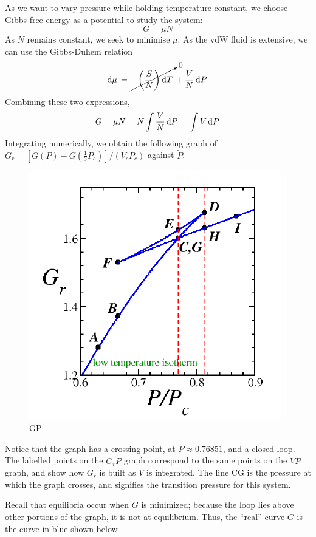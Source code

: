 As we want to vary pressure while holding temperature constant, we choose Gibbs free energy as a potential to study the system:
\[G=\mu N\]
As \(N\) remains constant, we seek to minimise \(\mu\). As the vdW fluid is extensive, we can use the Gibbs-Duhem relation
\[\d\mu =\cancelto{0}{-\left(\frac{S}{N}\right)\d{T}}+\frac{V}{N}\d{P}\]
Combining these two expressions,
\[G=\mu N = N\int\frac{V}{N}\d{P}=\int V\d{P}\]
Integrating numerically, we obtain the following graph of \(G_r = [G(P)-G(\frac{1}{3}P_c)]/(V_cP_c)\) against \(\tilde P\).

\begin{figure}[!htbp]
	\begin{center}
		\includegraphics[scale=.6]{diagrams/phase/gp.png}
	\end{center}
	\caption{GP}\label{fig16:gp}
\end{figure}

Notice that the graph has a crossing point, at \(P\approx 0.76851\), and a closed loop.
The labelled points on the \(G_r\tilde P\) graph correspond to the same points on the \(\tilde V \tilde P\) graph, and show how \(G_r\) is built as \(V\) is integrated. The line CG is the pressure at which the graph crosses, and signifies the transition pressure for this system.

Recall that equilibria occur when \(G\) is minimized; because the loop lies above other portions of the graph, it is not at equilibrium. Thus, the ``real'' curve \(G\) is the curve in blue shown below

